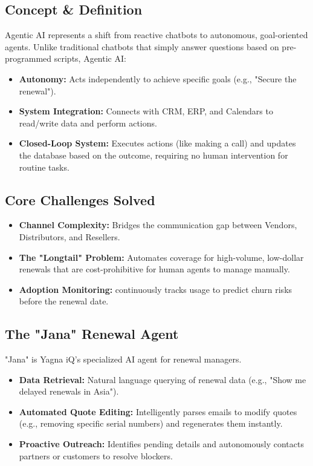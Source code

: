 \documentclass[12pt,a4paper]{article}
\begin{document}
\subsection{Concept & Definition}
Agentic AI represents a shift from reactive chatbots to autonomous, goal-oriented agents. Unlike traditional chatbots that simply answer questions based on pre-programmed scripts, Agentic AI:
\begin{itemize}
    \item \textbf{Autonomy:} Acts independently to achieve specific goals (e.g., "Secure the renewal").
    \item \textbf{System Integration:} Connects with CRM, ERP, and Calendars to read/write data and perform actions.
    \item \textbf{Closed-Loop System:} Executes actions (like making a call) and updates the database based on the outcome, requiring no human intervention for routine tasks.
\end{itemize}

\subsection{Core Challenges Solved}
\begin{itemize}
    \item \textbf{Channel Complexity:} Bridges the communication gap between Vendors, Distributors, and Resellers.
    \item \textbf{The "Longtail" Problem:} Automates coverage for high-volume, low-dollar renewals that are cost-prohibitive for human agents to manage manually.
    \item \textbf{Adoption Monitoring:} continuously tracks usage to predict churn risks before the renewal date.
\end{itemize}

\subsection{The "Jana" Renewal Agent}
"Jana" is Yagna iQ's specialized AI agent for renewal managers.
\begin{itemize}
    \item \textbf{Data Retrieval:} Natural language querying of renewal data (e.g., "Show me delayed renewals in Asia").
    \item \textbf{Automated Quote Editing:} Intelligently parses emails to modify quotes (e.g., removing specific serial numbers) and regenerates them instantly.
    \item \textbf{Proactive Outreach:} Identifies pending details and autonomously contacts partners or customers to resolve blockers.
\end{itemize}
\end{document}
